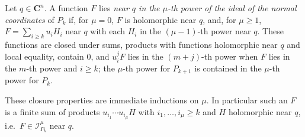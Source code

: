 \begin{definition}
\label{mc:normal-power}
\leanok
Let \(q\in\mathbf C^n\). A function \(F\) lies \emph{near \(q\) in the \(\mu\)-th power of the ideal of the normal coordinates}
of \(P_k\) if, for \(\mu=0\), \(F\) is holomorphic near \(q\), and, for \(\mu\ge1\), \(F=\sum_{i\ge k}u_iH_i\) near \(q\) with each
\(H_i\) in the \((\mu-1)\)-th power near \(q\). These functions are closed under sums, products with functions holomorphic
near \(q\) and local equality, contain \(0\), and \(u_i^jF\) lies in the \((m+j)\)-th power when \(F\) lies in the \(m\)-th power
and \(i\ge k\); the \(\mu\)-th power for \(P_{k+1}\) is contained in the \(\mu\)-th power for \(P_k\).
\end{definition}
These closure properties are immediate inductions on \(\mu\). In particular such an \(F\) is a finite sum of
products \(u_{i_1}\cdots u_{i_\mu}H\) with \(i_1,\dots,i_\mu\ge k\) and \(H\) holomorphic near \(q\), i.e.\ \(F\in\mathcal I_{P_k}^\mu\) near \(q\).

